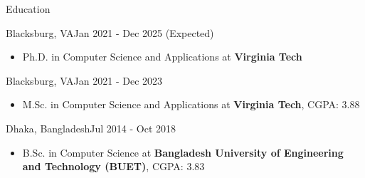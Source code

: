\documentclass[]{mcdowellcv}
\begin{document}
	\makeheader
	
	\begin{cvsection}{Education}
		\begin{cvsubsection}{Blacksburg, VA}{}{Jan 2021 - Dec 2025 (Expected)}
			\begin{itemize}
				\item Ph.D. in Computer Science and Applications at \textbf{Virginia Tech} %
			\end{itemize}
		\end{cvsubsection}
		\begin{cvsubsection}{Blacksburg, VA}{}{Jan 2021 - Dec 2023}
			\begin{itemize}
				\item M.Sc. in Computer Science and Applications at \textbf{Virginia Tech}, CGPA: 3.88
			\end{itemize}
		\end{cvsubsection}
		\begin{cvsubsection}{Dhaka, Bangladesh}{}{Jul 2014 - Oct 2018}
			\begin{itemize}
				\item B.Sc. in Computer Science at \textbf{Bangladesh University of Engineering and Technology (BUET)}, CGPA: 3.83
			\end{itemize}
		\end{cvsubsection}
	\end{cvsection}
\end{document}

